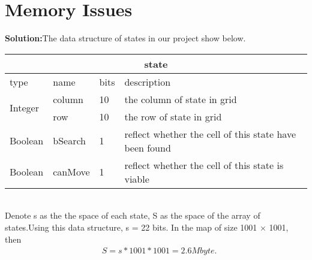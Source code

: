 \section{Memory Issues}
\textbf{Solution:}The data structure of states in our project show below.\\

\begin{tabular}{|l|l|l|l|}
\hline
\multicolumn{4}{|c|}{state}\\
\hline
type&name&bits&description\\
\hline
\multirow{2}{*}{Integer}
&column&10&the column of state in grid\\
&row&10&the row of state in grid\\
\hline
Boolean&bSearch&1&reflect whether the cell of this state have been found\\
\hline
Boolean&canMove&1&reflect whether the cell of this state is viable\\
\hline
\end{tabular}\\

Denote s as the the space of each state, S as the space of the array of states.Using this data structure, s = 22 bits. In the map of size 1001 $\times$ 1001, then
\begin{equation*}
  \begin{aligned}
   &S = s * 1001 * 1001 = 2.6 Mbyte.
  \end{aligned}
\end{equation*}


